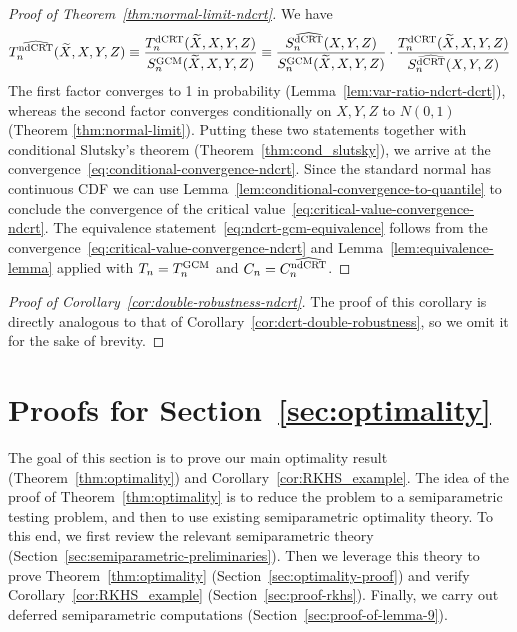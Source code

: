 \documentclass[aos]{imsart}
\theoremstyle{plain}
\theoremstyle{remark}
\newcommand{\srx}{X}									%
\newcommand{\srz}{Z}									%
\newcommand{\srxk}{\widetilde X}						%
\newcommand{\sry}{Y}									%
\newcommand{\dCRT}{\textnormal{dCRT}} 					%
\newcommand{\GCM}{\textnormal{GCM}}						%
\newcommand{\dCRThat}{\widehat{\textnormal{dCRT}}}		%
\newcommand{\ndCRThat}{\widehat{\textnormal{ndCRT}}}	%
\begin{document}
\begin{proof}[Proof of Theorem~\ref{thm:normal-limit-ndcrt}]
We have
\begin{equation*}
T_n^{\ndCRThat}(\srxk, \srx, \sry, \srz) \equiv \frac{T_n^{\dCRT}(\srxk, \srx, \sry, \srz)}{S_n^{\GCM}(\srxk, \srx, \sry, \srz)} \equiv  \frac{S_n^{\dCRThat}(\srx, \sry, \srz)}{S_n^{\GCM}(\srxk, \srx, \sry, \srz)} \cdot \frac{T_n^{\dCRT}(\srxk, \srx, \sry, \srz)}{S_n^{\dCRThat}(\srx, \sry, \srz)}
\end{equation*}
The first factor converges to 1 in probability (Lemma~\ref{lem:var-ratio-ndcrt-dcrt}), whereas the second factor converges conditionally on $\srx, \sry, \srz$ to $N(0,1)$ (Theorem \ref{thm:normal-limit}). Putting these two statements together with conditional Slutsky's theorem (Theorem~\ref{thm:cond_slutsky}), we arrive at the convergence~\eqref{eq:conditional-convergence-ndcrt}. Since the standard normal has continuous CDF we can use Lemma~\ref{lem:conditional-convergence-to-quantile} to conclude the convergence of the critical value~\eqref{eq:critical-value-convergence-ndcrt}. The equivalence statement~\eqref{eq:ndcrt-gcm-equivalence} follows from the convergence~\eqref{eq:critical-value-convergence-ndcrt} and Lemma~\ref{lem:equivalence-lemma} applied with $T_n = T_n^{\GCM}$ and $C_n = C_n^{\ndCRThat}$.
\end{proof}

\begin{proof}[Proof of Corollary~\ref{cor:double-robustness-ndcrt}] 
 
The proof of this corollary is directly analogous to that of Corollary~\ref{cor:dcrt-double-robustness}, so we omit it for the sake of brevity.

\end{proof}

\section{Proofs for Section~\ref{sec:optimality}} \label{sec:optimality-proofs}

The goal of this section is to prove our main optimality result (Theorem~\ref{thm:optimality}) and Corollary~\ref{cor:RKHS_example}. The idea of the proof of Theorem~\ref{thm:optimality} is to reduce the problem to a semiparametric testing problem, and then to use existing semiparametric optimality theory. To this end, we first review the relevant semiparametric theory (Section~\ref{sec:semiparametric-preliminaries}). Then we leverage this theory to prove Theorem~\ref{thm:optimality} (Section~\ref{sec:optimality-proof}) and verify Corollary~\ref{cor:RKHS_example} (Section~\ref{sec:proof-rkhs}). Finally, we carry out deferred semiparametric computations (Section~\ref{sec:proof-of-lemma-9}).
\end{document}
